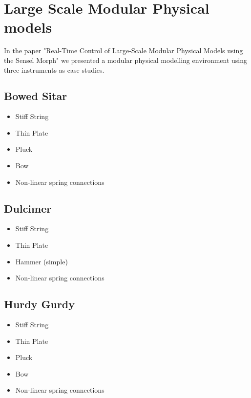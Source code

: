 \chapter{Large Scale Modular Physical models}\label{ch:largeScale}
In the paper "Real-Time Control of Large-Scale Modular Physical Models using the Sensel Morph" \citeP[A] we presented a modular physical modelling environment using three instruments as case studies. 

\section{Bowed Sitar}
\begin{itemize}
    \item Stiff String
    \item Thin Plate
    \item Pluck
    \item Bow
    \item Non-linear spring connections
\end{itemize}

\section{Dulcimer}
\begin{itemize}
    \item Stiff String
    \item Thin Plate
    \item Hammer (simple)
    \item Non-linear spring connections
\end{itemize}

\section{Hurdy Gurdy}
\begin{itemize}
    \item Stiff String
    \item Thin Plate
    \item Pluck
    \item Bow
    \item Non-linear spring connections
\end{itemize}